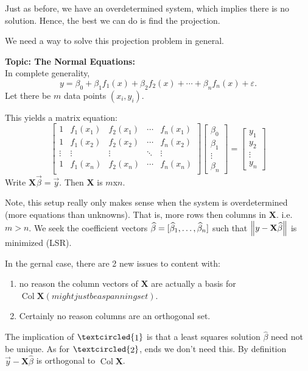 \nl Just as before, we have an overdetermined system, which implies there is no solution. Hence, the best we can do is find the projection.

\nl We need a way to solve this projection problem in general. 

\nnl \textbf{Topic: The Normal Equations: }\\
In complete generality, $$y = \beta_0 + \beta_1 f_1(x) + \beta_2 f_2(x) + \cdots + \beta_n f_n(x) + \varepsilon.$$
Let there be $m$ data points $(x_i, y_i)$.

\nl This yields a matrix equation:
$$\begin{bmatrix}
    1 & f_1(x_1) & f_2(x_1) & \cdots & f_n(x_1)\\
    1 &  f_1(x_2) & f_2(x_2) & \cdots & f_n(x_2)\\
    \vdots & \vdots & \vdots & \ddots & \vdots \\
    1 &  f_1(x_n) & f_2(x_n) & \cdots & f_n(x_n)\\
\end{bmatrix} \begin{bmatrix}
    \beta_0 \\ \beta_1 \\ \vdots \\ \beta_n
\end{bmatrix} = \begin{bmatrix}
    y_1\\ y_2 \\ \vdots \\ y_n
\end{bmatrix}$$
Write $\mathbf X \vec{\beta} = \vec y$. Then $\mathbf X$ is $m$x$n$.

\nl Note, this setup really only makes sense when the system is overdetermined (more equations than unknowns). That is, more rows then columns in $\mathbf X$. i.e. $m > n$. We seek the coefficient vectors $\widehat{\beta} = [{\widehat{\beta}}_1, \dots, {\widehat{\beta}}_n]$ such that $\norm{y - \mathbf X \widehat{\beta}}$ is minimized (LSR).

\nl In the gernal case, there are 2 new issues to content with:
\begin{enumerate}[label=\textcircled{\raisebox{-1pt}{\arabic*}}]
    \item no reason the column vectors of $\mathbf X$ are actually a basis for $\operatorname{Col} \mathbf X (might just be a spanning set)$.
    \item Certainly no reason columns are an orthogonal set. 
\end{enumerate}
The implication of $\textcircled{\raisebox{-1pt}{1}}$ is that a least squares solution $\widehat{\beta}$ need not be unique. As for $\textcircled{\raisebox{-1pt}{2}}$, ends we don't need this. By definition $\vec y - \mathbf X \widehat{\beta}$ is orthogonal to $\operatorname{Col}\mathbf X$.

